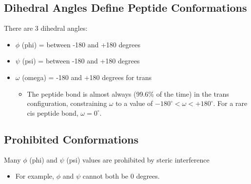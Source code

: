 \documentclass[10pt]{article}
\begin{document}
\subsection*{Dihedral Angles Define Peptide Conformations}
There are 3 dihedral angles:
\begin{itemize}
    \item $\phi$ (phi) = between -180 and +180 degrees
    \item $\psi$ (psi) = between -180 and +180 degrees
    \item $\omega$ (omega) = -180 and +180 degrees for trans
    \begin{itemize}
        \item The peptide bond is almost always (99.6\% of the time) in the trans configuration, constraining $\omega$ to a value of $-180^\circ < \omega < +180^\circ$.  For a rare cis peptide bond, $\omega = 0^\circ$.
    \end{itemize}
\end{itemize}

\subsection*{Prohibited Conformations}
Many $\phi$ (phi) and $\psi$ (psi) values are prohibited by steric interference
\begin{itemize}
    \item For example, $\phi$ and $\psi$ cannot both be 0 degrees.
\end{itemize}
\end{document}
